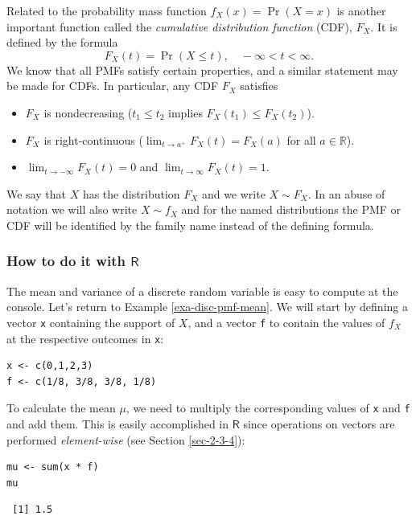 \documentclass[captions=tableheading]{scrbook}
\begin{document}
Related to the probability mass function \(f_{X}(x)=\Pr(X=x)\) is another important function called the \emph{cumulative distribution function} (CDF), \(F_{X}\). It is defined by the formula
\begin{equation}
F_{X}(t)=\Pr(X\leq t),\quad-\infty<t<\infty.
\end{equation}
We know that all PMFs satisfy certain properties, and a similar statement may be made for CDFs. In particular, any CDF \(F_{X}\) satisfies
\begin{itemize}
\item \(F_{X}\) is nondecreasing (\(t_{1}\leq t_{2}\) implies \(F_{X}(t_{1})\leq F_{X}(t_{2})\)).
\item \(F_{X}\) is right-continuous (\(\lim_{t\to a^{+}}F_{X}(t)=F_{X}(a)\) for all \(a\in\mathbb{R}\)).
\item \(\lim_{t\to-\infty}F_{X}(t)=0\) and \(\lim_{t\to\infty}F_{X}(t)=1\).
\end{itemize}
We say that \(X\) has the distribution \(F_{X}\) and we write \(X\sim F_{X}\). In an abuse of notation we will also write \(X\sim f_{X}\) and for the named distributions the PMF or CDF will be identified by the family name instead of the defining formula.
\subsubsection{How to do it with \(\mathsf{R}\)}
\label{sec-5-1-2-1}
\label{sub-disc-rv-how-r}


The mean and variance of a discrete random variable is easy to compute at the console. Let's return to Example \ref{exa-disc-pmf-mean}. We will start by defining a vector \texttt{x} containing the support of \(X\), and a vector \texttt{f} to contain the values of \(f_{X}\) at the respective outcomes in \texttt{x}:


\begin{verbatim}
x <- c(0,1,2,3)
f <- c(1/8, 3/8, 3/8, 1/8)
\end{verbatim}

To calculate the mean \(\mu\), we need to multiply the corresponding values of \texttt{x} and \texttt{f} and add them. This is easily accomplished in \(\mathsf{R}\) since operations on vectors are performed \emph{element-wise} (see Section \ref{sec-2-3-4}): 


\begin{verbatim}
mu <- sum(x * f)
mu
\end{verbatim}

\begin{verbatim}
 [1] 1.5
\end{verbatim}
\end{document}
